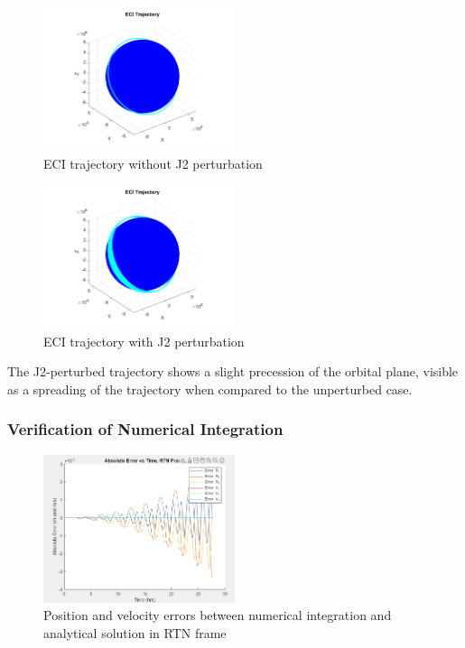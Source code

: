 \begin{figure}[H]
    \centering
    \includegraphics[width=0.5\textwidth]{PS1/Figures/eci_trajectory_unperturbed.png}
    \caption{ECI trajectory without J2 perturbation}
    \label{fig:eci_unperturbed}
\end{figure}

\begin{figure}[H]
    \centering
    \includegraphics[width=0.5\textwidth]{PS1/Figures/eci_trajectory_j2.png}
    \caption{ECI trajectory with J2 perturbation}
    \label{fig:eci_j2}
\end{figure}

The J2-perturbed trajectory shows a slight precession of the orbital plane, visible as a spreading of the trajectory when compared to the unperturbed case.

\subsubsection{Verification of Numerical Integration}

\begin{figure}[H]
    \centering
    \includegraphics[width=0.5\textwidth]{PS1/Figures/error_comparison.png}
    \caption{Position and velocity errors between numerical integration and analytical solution in RTN frame}
    \label{fig:error_comparison}
\end{figure}

